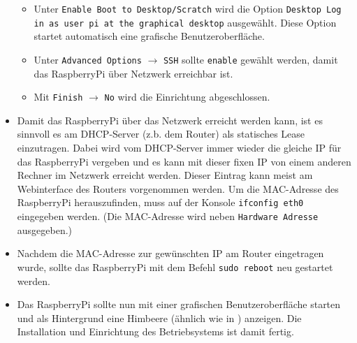 \begin{itemize}
{\begin{itemize}
{			(Hinweis: Bei der Eingabe des Passwortes wird nichts angezeigt. Auch keine \lstinline|*|-Zeichen.)}
		\item {Unter \lstinline|Enable Boot to Desktop/Scratch| wird die Option \lstinline|Desktop Log in as user pi at the graphical desktop| ausgewählt. 
			Diese Option startet automatisch eine grafische Benutzeroberfläche.}
		\item {Unter \lstinline|Advanced Options| $\rightarrow$ \lstinline|SSH| sollte \lstinline|enable| gewählt werden, damit das RaspberryPi über Netzwerk erreichbar ist.}
		\item {Mit \lstinline|Finish| $\rightarrow$ \lstinline|No| wird die Einrichtung abgeschlossen.}
		\end{itemize}
		}
	\item {Damit das RaspberryPi über das Netzwerk erreicht werden kann, ist es sinnvoll es am DHCP-Server (z.b. dem Router) als statisches Lease \cite{lease} einzutragen.
		Dabei wird vom DHCP-Server immer wieder die gleiche IP für das RaspberryPi vergeben und es kann mit dieser fixen IP von einem anderen Rechner im Netzwerk erreicht werden.
		Dieser Eintrag kann meist am Webinterface des Routers vorgenommen werden.
		Um die MAC-Adresse des RaspberryPi herauszufinden, muss auf der Konsole \lstinline|ifconfig eth0| eingegeben werden.
		(Die MAC-Adresse wird neben \lstinline|Hardware Adresse| ausgegeben.)
		}
	\item {Nachdem die MAC-Adresse zur gewünschten IP am Router eingetragen wurde, sollte das RaspberryPi mit dem Befehl \lstinline|sudo reboot| neu gestartet werden.
		}
	\item {Das RaspberryPi sollte nun mit einer grafischen Benutzeroberfläche starten und als Hintergrund eine Himbeere (ähnlich wie in ) anzeigen.
		Die Installation und Einrichtung des Betriebsystems ist damit fertig.
		}
\end{itemize}

